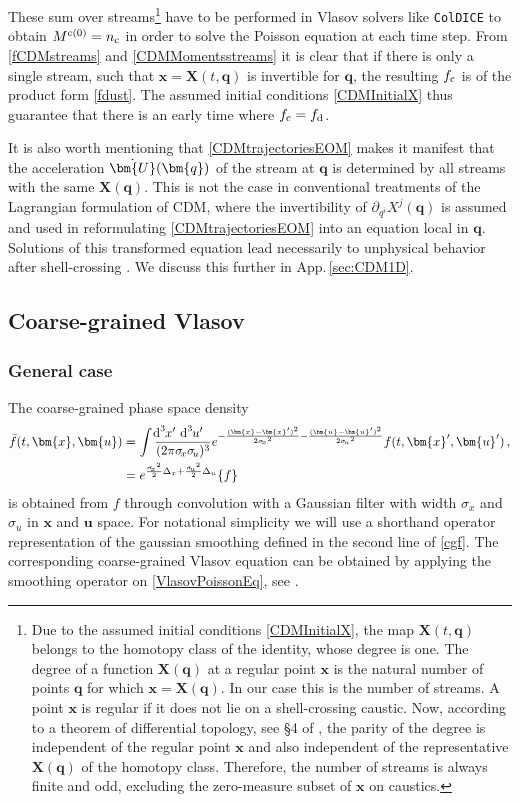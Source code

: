 \documentclass[twocolumn, nofootinbib, showpacs, superscriptaddress]{revtex4-1}
\newcommand{\sigu}{{\sigma_{\! u}}}
\newcommand{\sigx}{{\sigma_{\! x}}}
\renewcommand{\d}[0]{{\rm{d}}}
\renewcommand{\c}[0]{{\rm{c}}}
\newcommand{\vol}[2]{\hspace{-0.8mm}\mbox{$\text{d}^{\hspace{-0.0mm}#1}$}\hspace{-0.2mm}#2\hspace{0.8mm}\ }
\renewcommand{\v}[1]{\bm{#1} }
\newcommand{\vx}[0]{\bm{x} }
\newcommand{\vX}[0]{\bm{X} }
\newcommand{\vq}[0]{\bm{q} }
\newcommand{\vu}[0]{\bm{u} }
\newcommand{\vU}[0]{\bm{U} }
\begin{document}
These sum over streams\footnote{Due to the assumed initial conditions \eqref{CDMInitialX}, the map $\vX(t,\vq)$ belongs to the homotopy class of the identity, whose degree is one. 
The degree of a function $\vX(\vq)$ at a regular point $\vx$  is the natural number of points $\v{q}$ for which $\vx= \vX(\vq)$. 
In our case this is the number of streams. A point $\vx$ is regular if it does not lie on a shell-crossing caustic. 
Now, according to a theorem of differential topology, see \S4 of \cite{Milnor1988}, the parity of the degree is independent of the regular point $\vx$ and also independent of the representative $\vX(\vq)$ of the homotopy class. Therefore, the number of streams is always finite and odd, excluding the zero-measure subset of   $\vx$ on caustics.} have to be performed in Vlasov solvers like \texttt{ColDICE} to obtain $M^{\c (0)} = n_\c$ in order to solve the Poisson equation at each time step.
From \eqref{fCDMstreams} and \eqref{CDMMomentsstreams} it is clear that if there is only a single stream, such that $\vx=\vX(t,\vq)$ is invertible for $\vq$, the resulting $f_\c$ is of the product form \eqref{fdust}.
 The assumed initial conditions \eqref{CDMInitialX} thus guarantee that there is an early time where $f_\c = f_\d$.

It is also worth mentioning that \eqref{CDMtrajectoriesEOM} makes it manifest that the acceleration $\dot \vU(\vq)$ of the stream at $\vq$ is determined by all streams with the same $\vX(\vq)$. 
This is not the case in conventional treatments of the Lagrangian formulation of CDM, where the invertibility of $\partial_{q^i} X^j(\vq)$ is assumed and used in reformulating \eqref{CDMtrajectoriesEOM} into an equation local in $\vq$. 
Solutions of this transformed equation lead necessarily to unphysical behavior after shell-crossing \cite{Buchert1996}.
We discuss this further in App.\,\ref{sec:CDM1D}. 

\subsection{Coarse-grained Vlasov}
\subsubsection{General case}
The coarse-grained phase space density
\begin{align}
\label{cgf}
\notag  \bar f (t, \vx,\vu)&=\int \frac{\vol{3}{x'}\vol{3}{u'}}{(2 \pi\sigx\sigu)^3 } 
   e^{-\frac{(\vx-\vx')^2}{2\sigx^2}-\frac{(\vu-\vu')^2}{2\sigu^2} } f(t, \vx',\vu')\,,
\\
&= e^{\frac{\sigx^2}{2}\Delta_x+\frac{\sigu^2}{2}\Delta_u} \{f\}\ 
\end{align}
 is obtained from $f$ through convolution with a Gaussian filter with width $\sigx$ and $\sigu$ in $\vx$ and $\vu$ space.
  For notational simplicity we will use a shorthand operator representation of the gaussian smoothing defined in the second line of \eqref{cgf}.
The corresponding coarse-grained Vlasov equation can be obtained by applying the smoothing operator on \eqref{VlasovPoissonEq}, 
see \cite{MW03,UhlemannKoppHaugg2014}.
\end{document}
